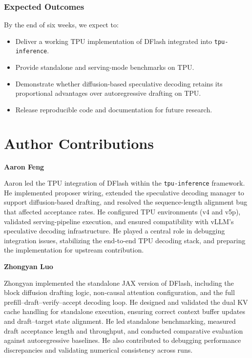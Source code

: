 \documentclass[12pt,letterpaper]{article}
\begin{document}
\subsubsection*{Expected Outcomes}

By the end of six weeks, we expect to:

\begin{itemize}
    \item Deliver a working TPU implementation of DFlash integrated into \texttt{tpu-inference}.
    \item Provide standalone and serving-mode benchmarks on TPU.
    \item Demonstrate whether diffusion-based speculative decoding retains its proportional advantages over autoregressive drafting on TPU.
    \item Release reproducible code and documentation for future research.
\end{itemize}

\clearpage

\section*{Author Contributions}

\textbf{Aaron Feng}

Aaron led the TPU integration of DFlash within the \texttt{tpu-inference} framework. He implemented proposer wiring, extended the speculative decoding manager to support diffusion-based drafting, and resolved the sequence-length alignment bug that affected acceptance rates. He configured TPU environments (v4 and v5p), validated serving-pipeline execution, and ensured compatibility with vLLM’s speculative decoding infrastructure. He played a central role in debugging integration issues, stabilizing the end-to-end TPU decoding stack, and preparing the implementation for upstream contribution.

\medskip

\textbf{Zhongyan Luo}

Zhongyan implemented the standalone JAX version of DFlash, including the block diffusion drafting logic, non-causal attention configuration, and the full prefill–draft–verify–accept decoding loop. He designed and validated the dual KV cache handling for standalone execution, ensuring correct context buffer updates and draft–target state alignment. He led standalone benchmarking, measured draft acceptance length and throughput, and conducted comparative evaluation against autoregressive baselines. He also contributed to debugging performance discrepancies and validating numerical consistency across runs.
\end{document}
